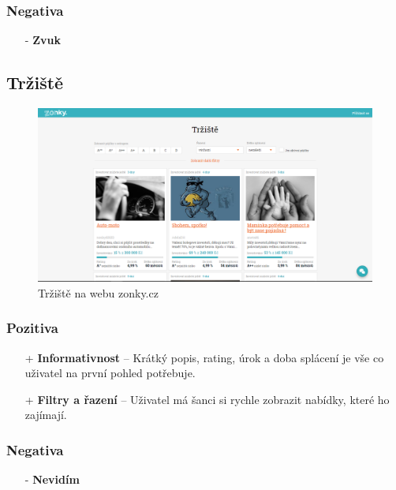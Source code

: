\subsubsection*{Negativa}
\begin{itemize}
    \item[-] \textbf{Zvuk}
\end{itemize}



\newpage
\subsection{Tržiště}
\begin{figure}[h]
    \centering
    \includegraphics[width=1.0\textwidth]{media/zonky/marketplace.png}
    \caption{Tržiště na webu zonky.cz}
    \label{fig:zonky:marketplace}
\end{figure}
\subsubsection*{Pozitiva}
\begin{itemize}
    \item[+] \textbf{Informativnost} -- Krátký popis, rating, úrok a doba splácení je vše co uživatel na první pohled potřebuje.
    \item[+] \textbf{Filtry a řazení} -- Uživatel má šanci si rychle zobrazit nabídky, které ho zajímají.
\end{itemize}
\subsubsection*{Negativa}
\begin{itemize}
    \item[-] \textbf{Nevidím}
\end{itemize}


